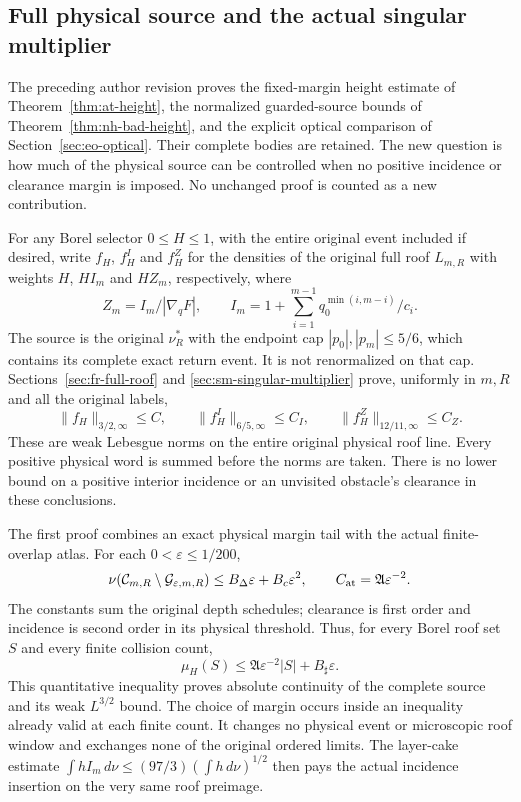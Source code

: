 \subsection*{Full physical source and the actual singular multiplier}
The preceding author revision proves the fixed-margin height estimate
of Theorem~\ref{thm:at-height}, the normalized guarded-source bounds
of Theorem~\ref{thm:nh-bad-height}, and the explicit optical comparison
of Section~\ref{sec:eo-optical}. Their complete bodies are retained.
The new question is how much of the physical source can be controlled
when no positive incidence or clearance margin is imposed. No unchanged
proof is counted as a new contribution.

For any Borel selector $0\le H\le1$, with the entire original event
included if desired, write $f_H$, $f_H^I$ and $f_H^Z$ for the densities
of the original full roof $L_{m,R}$ with weights $H$, $HI_m$ and
$HZ_m$, respectively, where
\[
 Z_m=I_m/|\nabla_qF|,\qquad
 I_m=1+\sum_{i=1}^{m-1}q_0^{\min(i,m-i)}/c_i.
\]
The source is the original $\nu_R^*$ with the endpoint cap
$|p_0|,|p_m|\le5/6$, which contains its complete exact return event.
It is not renormalized on that cap. Sections~\ref{sec:fr-full-roof}
and \ref{sec:sm-singular-multiplier} prove, uniformly in $m,R$ and
all the original labels,
\[
 \|f_H\|_{3/2,\infty}\le C,
 \qquad \|f_H^I\|_{6/5,\infty}\le C_I,
 \qquad \|f_H^Z\|_{12/11,\infty}\le C_Z.
\]
These are weak Lebesgue norms on the entire original physical roof
line. Every positive physical word is summed before the norms are taken.
There is no lower bound on a positive interior incidence or an unvisited
obstacle's clearance in these conclusions.

The first proof combines an exact physical margin tail with the actual
finite-overlap atlas. For each $0<\varepsilon\le1/200$,
\[
 \nu(\mathcal C_{m,R}\setminus\mathcal G_{\varepsilon,m,R})
 \le B_\Delta\varepsilon+B_c\varepsilon^2,
 \qquad C_{\rm at}=\mathfrak A\varepsilon^{-2}.
\]
The constants sum the original depth schedules; clearance is first order
and incidence is second order in its physical threshold. Thus, for every
Borel roof set $S$ and every finite collision count,
\[
 \mu_H(S)\le\mathfrak A\varepsilon^{-2}|S|
                         +B_\sharp\varepsilon.
\]
This quantitative inequality proves absolute continuity of the complete
source and its weak $L^{3/2}$ bound. The choice of margin occurs inside
an inequality already valid at each finite count. It changes no physical
event or microscopic roof window and exchanges none of the original
ordered limits. The layer-cake estimate
$\int hI_m\,d\nu\le(97/3)(\int h\,d\nu)^{1/2}$ then pays the actual
incidence insertion on the very same roof preimage.

